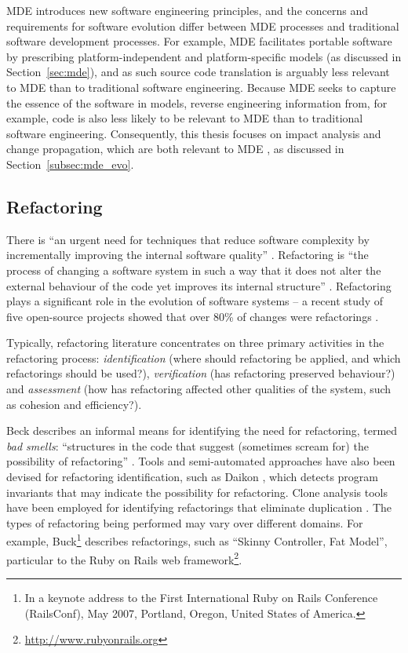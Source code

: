 MDE introduces new software engineering principles, and  the concerns and requirements for software evolution differ between MDE processes and traditional software development processes. For example, MDE facilitates portable software by prescribing platform-independent and platform-specific models (as discussed in Section~\ref{sec:mde}), and as such source code translation is arguably less relevant to MDE than to traditional software engineering. Because MDE seeks to capture the essence of the software in models, reverse engineering information from, for example, code is also less likely to be relevant to MDE than to traditional software engineering. Consequently, this thesis focuses on impact analysis and change propagation, which are both relevant to MDE \cite{winkler09survey}, as discussed in Section~\ref{subsec:mde_evo}.

\subsection{Refactoring}
\label{subsec:refactoring}
There is ``an urgent need for techniques that reduce software complexity by incrementally improving the internal software quality'' \cite{mens04survey}. Refactoring is ``the process of changing a software system in such a way that it does not alter the external behaviour of the code yet improves its internal structure'' \cite[pg. xvi]{fowler99refactoring}. Refactoring plays a significant role in the evolution of software systems -- a recent study of five open-source projects showed that over 80\% of changes were refactorings \cite{dig06apis}.

Typically, refactoring literature concentrates on three primary activities in the refactoring process: \emph{identification} (where should refactoring be applied, and which refactorings should be used?), \emph{verification} (has refactoring preserved behaviour?) and \emph{assessment} (how has refactoring affected other qualities of the system, such as cohesion and efficiency?).

Beck describes an informal means for identifying the need for refactoring, termed \textit{bad smells}: ``structures in the code that suggest (sometimes scream for) the possibility of refactoring'' \cite[foreword]{fowler99refactoring}. Tools and semi-automated approaches have also been devised for refactoring identification, such as Daikon \cite{kataoka01automated}, which detects program invariants that may indicate the possibility for refactoring. Clone analysis tools have been employed for identifying refactorings that eliminate duplication \cite{balazinska00advanced,ducasse99language}. The types of refactoring being performed may vary over different domains. For example, Buck\footnote{In a keynote address to the First International Ruby on Rails Conference (RailsConf), May 2007, Portland, Oregon, United States of America.} describes refactorings, such as ``Skinny Controller, Fat Model'', particular to the Ruby on Rails web framework\footnote{\url{http://www.rubyonrails.org}}.

